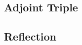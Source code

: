 \documentclass{drl-common/llncs}
\newcommand{\C}{\ensuremath{\mathcal{C}}}
\newcommand{\la}{\ensuremath{\dashv}}
\newcommand{\sh}{\text{\textesh}}
\begin{document}
\subsection{Adjoint Triple}

\subsection{Reflection}




\end{document}

